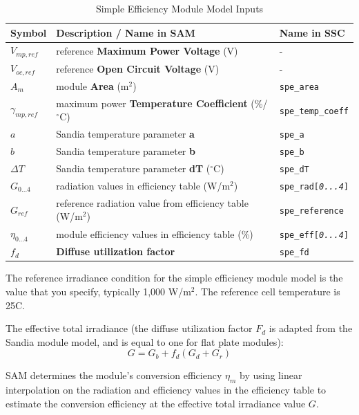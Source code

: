 \documentclass[12pt,letterpaper]{article}
\begin{document}
\begin{table}
\begin{center}
\caption{Simple Efficiency Module Model Inputs}
\begin{tabular}{lll}
\midrule
Symbol & Description / \textbf{Name in SAM} & Name in SSC \\
\midrule
$V_{mp,ref}$ & reference \textbf{Maximum Power Voltage} (V)& - \\
$V_{oc,ref}$ & reference \textbf{Open Circuit Voltage} (V)& - \\
$A_m$ & module \textbf{Area} (m$^2$)& \texttt{spe\_area} \\
$\gamma_{mp,ref}$ & maximum power \textbf{Temperature Coefficient} (\%/$^\circ$C) & \texttt{spe\_temp\_coeff} \\
$a$ & Sandia temperature parameter \textbf{a} & \texttt{spe\_a} \\
$b$ & Sandia temperature parameter \textbf{b} & \texttt{spe\_b} \\
$\Delta T$ & Sandia temperature parameter \textbf{dT} ($^\circ$C) & \texttt{spe\_dT} \\
$G_{0...4}$ & radiation values in efficiency table (W/m$^2$)& \texttt{spe\_rad[\textit{0...4}]} \\
$G_{ref}$ & reference radiation value from efficiency table (W/m$^2$) & \texttt{spe\_reference} \\
$\eta_{0...4}$ & module efficiency values in efficiency table (\%)& \texttt{spe\_eff[\textit{0...4}]} \\
$f_d$ & \textbf{Diffuse utilization factor} & \texttt{spe\_fd} \\
\hline
\end{tabular}
\label{tab-spemodulevars}
\end{center}
\end{table}

The reference irradiance condition for the simple efficiency module model is the value that you specify, typically 1,000 W/m$^2$. The reference cell temperature is 25\degree C. 

The effective total irradiance (the diffuse utilization factor $F_d$ is adapted from the Sandia module model, and is equal to one for flat plate modules):
\begin{equation}
G = G_b + f_d(G_d+G_r)
\end{equation}

SAM determines the module's conversion efficiency $\eta_m$ by using linear interpolation on the radiation and efficiency values in the efficiency table to estimate the conversion efficiency at the effective total irradiance value $G$.
\end{document}
